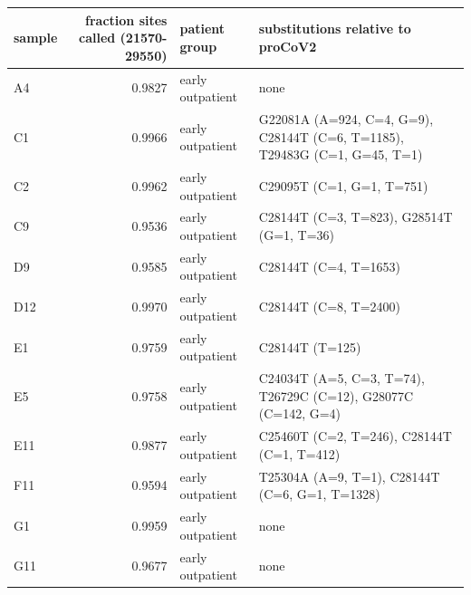 \documentclass[9pt,twocolumn,twoside]{gsajnl_modified}
\begin{document}
\begin{table}[b!]
{\small
\begin{tabular}{lrll}
\toprule
sample &  fraction sites called (21570-29550) &           patient group &                                        substitutions relative to proCoV2 \\
\midrule
A4 &                               0.9827 &        early outpatient &                                                                          none \\
C1 &                               0.9966 &        early outpatient &  G22081A (A=924, C=4, G=9), C28144T (C=6, T=1185), T29483G (C=1, G=45, T=1) \\
C2 &                               0.9962 &        early outpatient &                                                 C29095T (C=1, G=1, T=751)  \\
C9 &                               0.9536 &        early outpatient &                                  C28144T (C=3, T=823), G28514T (G=1, T=36)  \\
D9 &                               0.9585 &        early outpatient &                                                     C28144T (C=4, T=1653)  \\
D12 &                               0.9970 &        early outpatient &                                                     C28144T (C=8, T=2400)  \\
E1 &                               0.9759 &        early outpatient &                                                           C28144T (T=125)  \\
E5 &                               0.9758 &        early outpatient &              C24034T (A=5, C=3, T=74), T26729C (C=12), G28077C (C=142, G=4)  \\
E11 &                               0.9877 &        early outpatient &                                 C25460T (C=2, T=246), C28144T (C=1, T=412)  \\
F11 &                               0.9594 &        early outpatient &                             T25304A (A=9, T=1), C28144T (C=6, G=1, T=1328)  \\
G1 &                               0.9959 &        early outpatient &                                   none                                        \\
G11 &                               0.9677 &        early outpatient &                                  none                                         \\

\end{tabular}}
\end{table}
\end{document}
